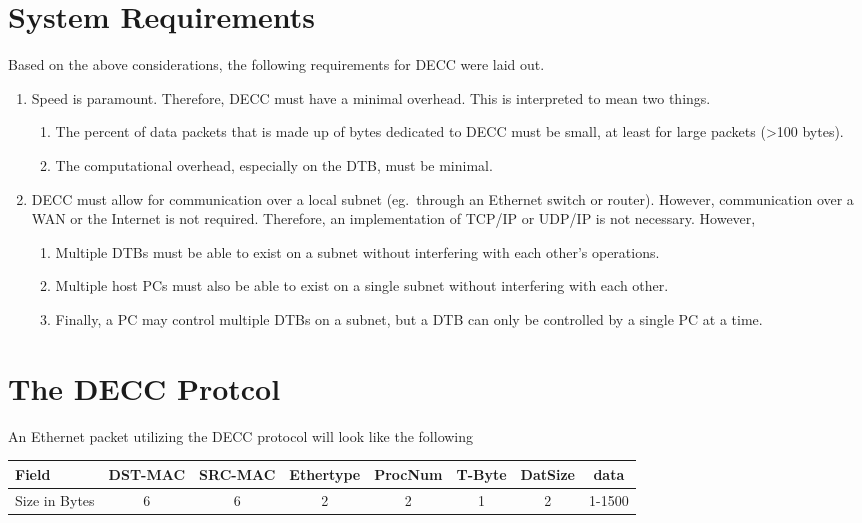 \documentclass{article}
\begin{document}
\section{System Requirements}
Based on the above considerations, the following requirements for DECC were laid
out.
\begin{enumerate}
  \item Speed is paramount. Therefore, DECC must have a minimal overhead. This
  is interpreted to mean two things.
  \begin{enumerate}
    \item The percent of data packets that is made up of bytes dedicated to DECC
    must be small, at least for large packets (\textgreater100 bytes).
    \item The computational overhead, especially on the DTB, must be minimal.
  \end{enumerate}
  \item DECC must allow for communication over a local subnet (eg.\ through an
  Ethernet switch or router). However, communication over a WAN or the Internet
  is not required. Therefore, an implementation of TCP/IP or UDP/IP is not
  necessary. However,
  \begin{enumerate}
    \item Multiple DTBs must be able to exist on a subnet without interfering
    with each other's operations.
    \item Multiple host PCs must also be able to exist on a single subnet
    without interfering with each other.
    \item Finally, a PC may control multiple DTBs on a subnet, but a DTB can
    only be controlled by a single PC at a time.
  \end{enumerate}
\end{enumerate}

\section{The DECC Protcol}
An Ethernet packet utilizing the DECC protocol will look like the following
\begin{table}[h]
\centering
\begin{tabular}{|l|c|c|c|c|c|c|c|}\hline
Field & DST-MAC & SRC-MAC & Ethertype & ProcNum & T-Byte & DatSize
& data \\ \hline 
Size in Bytes & 6 & 6 & 2 & 2 & 1 & 2 & 1-1500 \\ \hline
\end{tabular}
\end{table}
\end{document}

